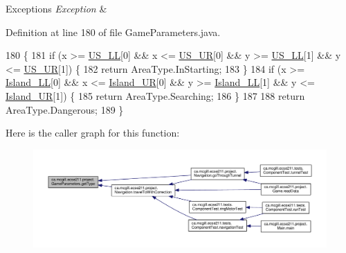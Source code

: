\begin{DoxyExceptions}{Exceptions}
{\em Exception} & \\
\hline
\end{DoxyExceptions}


Definition at line 180 of file Game\+Parameters.\+java.


\begin{DoxyCode}
180                                                \{
181     \textcolor{keywordflow}{if} (x >= \hyperlink{enumca_1_1mcgill_1_1ecse211_1_1project_1_1_game_parameters_a4b437dfb1ca3a0898631dfd670828202}{US\_LL}[0] && x <= \hyperlink{enumca_1_1mcgill_1_1ecse211_1_1project_1_1_game_parameters_ab53ad7cced40d028fd0bbc3472cd2f8d}{US\_UR}[0] && y >= \hyperlink{enumca_1_1mcgill_1_1ecse211_1_1project_1_1_game_parameters_a4b437dfb1ca3a0898631dfd670828202}{US\_LL}[1] && y <= 
      \hyperlink{enumca_1_1mcgill_1_1ecse211_1_1project_1_1_game_parameters_ab53ad7cced40d028fd0bbc3472cd2f8d}{US\_UR}[1]) \{
182       \textcolor{keywordflow}{return} AreaType.InStarting;
183     \}
184     \textcolor{keywordflow}{if} (x >= \hyperlink{enumca_1_1mcgill_1_1ecse211_1_1project_1_1_game_parameters_a70576bc98218fc0b4a7b2d3b2d56ed2b}{Island\_LL}[0] && x <= \hyperlink{enumca_1_1mcgill_1_1ecse211_1_1project_1_1_game_parameters_ac442a5d4a39d6ffae29a183eca5934d3}{Island\_UR}[0] && y >= 
      \hyperlink{enumca_1_1mcgill_1_1ecse211_1_1project_1_1_game_parameters_a70576bc98218fc0b4a7b2d3b2d56ed2b}{Island\_LL}[1] && y <= \hyperlink{enumca_1_1mcgill_1_1ecse211_1_1project_1_1_game_parameters_ac442a5d4a39d6ffae29a183eca5934d3}{Island\_UR}[1]) \{
185       \textcolor{keywordflow}{return} AreaType.Searching;
186     \}
187 
188     \textcolor{keywordflow}{return} AreaType.Dangerous;
189   \}
\end{DoxyCode}
Here is the caller graph for this function\+:
\nopagebreak
\begin{figure}[H]
\begin{center}
\leavevmode
\includegraphics[width=350pt]{enumca_1_1mcgill_1_1ecse211_1_1project_1_1_game_parameters_a4e7713b30588fc0b2af065db0b198b2c_icgraph}
\end{center}
\end{figure}


